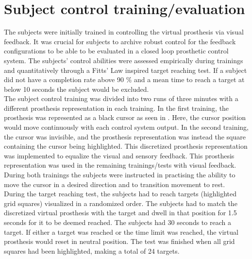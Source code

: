 \section{Subject control training/evaluation} \label{sec:pa:subjectcontrol}
The subjects were initially trained in controlling the virtual prosthesis via visual feedback. It was crucial for subjects to archive robust control for the feedback configurations to be able to be evaluated in a closed loop prosthetic control system. The subjects' control abilities were assessed empirically during trainings and quantitatively through a Fitts' Law inspired target reaching test. If a subject did not have a completion rate above 90 $\percent$ and a mean time to reach a target at below 10 seconds the subject would be excluded. \\
The subject control training was divided into two runs of three minutes with a different prosthesis representation in each training. In the first training, the prosthesis was represented as a black cursor as seen in . Here, the cursor position would move continuously with each control system output. In the second training, the cursor was invisible, and the prosthesis representation was instead the square containing the cursor being highlighted. This discretized prosthesis representation was implemented to equalize the visual and sensory feedback. This prosthesis representation was used in the remaining trainings/tests with visual feedback. During both trainings the subjects were instructed in practising the ability to move the cursor in a desired direction and to transition movement to rest. \\
During the target reaching test, the subjects had to reach targets (highlighted grid squares) visualized in a randomized order. The subjects had to match the discretized virtual prosthesis with the target and dwell in that position for 1.5 seconds for it to be deemed reached. The subjects had 30 seconds to reach a target. If either a target was reached or the time limit was reached, the virtual prosthesis would reset in neutral position. The test was finished when all grid squares had been highlighted, making a total of 24 targets. 